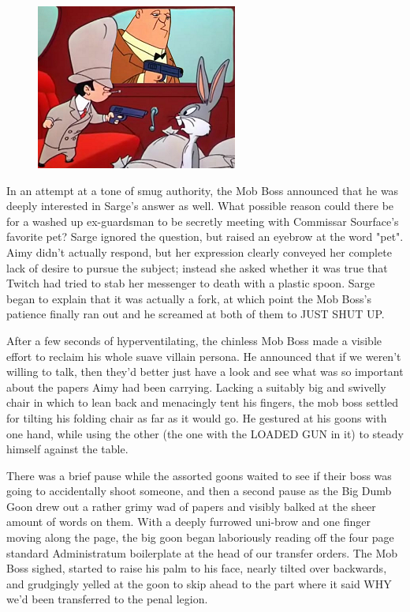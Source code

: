\begin{figure}
	\begin{center}
		\includegraphics[width=\figwidth]{pics/21/45.png}
	\end{center}
\end{figure}
In an attempt at a tone of smug authority, the Mob Boss announced that he was deeply interested in Sarge's answer as well. 
What possible reason could there be for a washed up ex-guardsman to be secretly meeting with Commissar Sourface's favorite pet? 
Sarge ignored the question, but raised an eyebrow at the word "pet". 
Aimy didn't actually respond, but her expression clearly conveyed her complete lack of desire to pursue the subject; 
instead she asked whether it was true that Twitch had tried to stab her messenger to death with a plastic spoon. 
Sarge began to explain that it was actually a fork, at which point the Mob Boss's patience finally ran out and he screamed at both of them to JUST SHUT UP.

After a few seconds of hyperventilating, the chinless Mob Boss made a visible effort to reclaim his whole suave villain persona. 
He announced that if we weren't willing to talk, then they'd better just have a look and see what was so important about the papers Aimy had been carrying. 
Lacking a suitably big and swivelly chair in which to lean back and menacingly tent his fingers, the mob boss settled for tilting his folding chair as far as it would go. 
He gestured at his goons with one hand, while using the other (the one with the LOADED GUN in it) to steady himself against the table.

There was a brief pause while the assorted goons waited to see if their boss was going to accidentally shoot someone, and then a second pause as the Big Dumb Goon drew out a rather grimy wad of papers and visibly balked at the sheer amount of words on them. 
With a deeply furrowed uni-brow and one finger moving along the page, the big goon began laboriously reading off the four page standard Administratum boilerplate at the head of our transfer orders. 
The Mob Boss sighed, started to raise his palm to his face, nearly tilted over backwards, and grudgingly yelled at the goon to skip ahead to the part where it said WHY we'd been transferred to the penal legion.

